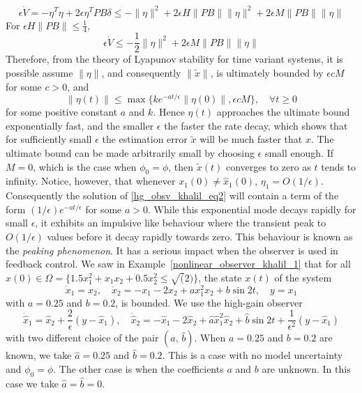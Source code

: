\documentclass[12pt,a4paper,oneside]{book}
\begin{document}
\begin{onehalfspace}
\begin{example}
\begin{equation*}
		\epsilon\dot{V}=-\eta^T\eta+2\epsilon\eta^TPB\delta\le-\|\eta\|^2+2\epsilon H\|PB\|\|\eta\|^2+2\epsilon M \|PB\|\|\eta\|
	\end{equation*}
	For $\epsilon H\|PB\|\le\frac{1}{4}$,
	\begin{equation*}
		\epsilon\dot{V}\le-\frac{1}{2}\|\eta\|^2+2\epsilon M\|PB\|\|\eta\|
	\end{equation*} 
	Therefore, from the theory of Lyapunov stability for time variant systems, it is possible assume $\|\eta\|$, and consequently $\|\tilde{x}\|$, is ultimately bounded by $\epsilon c M$ for some $c>0$, and
	\begin{equation*}
		\|\eta(t)\| \le \max \Big\{ke^{-at/\epsilon}\|\eta(0)\|,\epsilon c M\Big\},\quad \forall t\ge 0
	\end{equation*}
	for some positive constant $a$ and $k$. Hence $\eta(t)$ approaches the ultimate bound exponentially fast, and the smaller $\epsilon$ the faster the rate decay, which shows that for sufficiently small $\epsilon$ the estimation error $\tilde{x}$ will be much faster that $x$. The ultimate bound can be made arbitrarily small by choosing $\epsilon$ small enough. If $M=0$, which is the case when $\phi_0=\phi$, then $\tilde{x}(t)$ converges to zero as $t$ tends to infinity. Notice, however, that whenever $x_1(0)\ne\hat{x}_1(0)$, $\eta_1=O(1/\epsilon)$. Consequently the solution of \eqref{hg_obsv_khalil_eq2} will contain a term of the form $(1/\epsilon)e^{-at/\epsilon}$ for some $a>0$. While this exponential mode decays rapidly for small $\epsilon$, it exhibits an impulsive like behaviour where the transient peak to $O(1/\epsilon)$ values before it decay rapidly towards zero. This behaviour is known as the \textit{peaking phenomenon}. It has a serious impact when the observer is used in feedback control. We saw in Example~\ref{nonlinear_observer_khalil_1} that for all $x(0)\in \Omega=\big\{ 1.5x_1^2+x_1x_2+0.5x_2^2\le\sqrt(2)\big\}$, the state $x(t)$ of the system
	\begin{equation*}
		\dot{x}_1=x_2,\quad\dot{x}_2=-x_1-2x_2+ax_1^2x_2+b\sin2t,\quad y=x_1
	\end{equation*} 
	with $a=0.25$ and $b=0.2$, is bounded. We use the high-gain observer
	\begin{equation*}
		\dot{\hat{x}}_1=\hat{x}_2+\frac{2}{\epsilon}(y-\hat{x}_1),\quad\dot{\hat{x}}_2=-\hat{x}_1-2\hat{x}_2+\hat{a}\hat{x}_1^2\hat{x}_2+\hat{b}\sin2t+\frac{1}{\epsilon^2}(y-\hat{x}_1)
	\end{equation*}
	with two different choice of the pair $(\hat{a},\,\hat{b})$. When $a=0.25$ and $b=0.2$ are known, we take $\hat{a}=0.25$ and $\hat{b}=0.2$. This is a case with no model uncertainty and $\phi_0=\phi$. The other case is when the coefficients $a$ and $b$ are unknown. In this case we take $\hat{a}=\hat{b}=0$.  


\end{example}
\end{onehalfspace}
\end{document}
